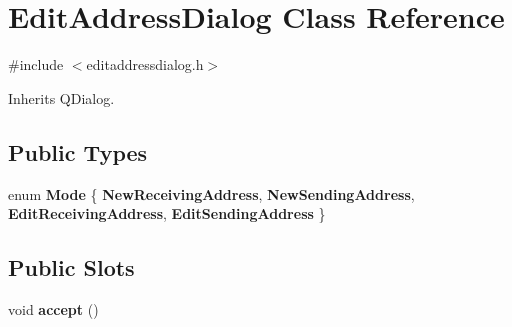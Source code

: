 \hypertarget{class_edit_address_dialog}{}\section{Edit\+Address\+Dialog Class Reference}
\label{class_edit_address_dialog}


{\ttfamily \#include $<$editaddressdialog.\+h$>$}



Inherits Q\+Dialog.

\subsection*{Public Types}
\begin{DoxyCompactItemize}
\item 
\mbox{\label{class_edit_address_dialog_a456fdd27ee1c150824241ded7bb4de3a}} 
enum {\bfseries Mode} \{ {\bfseries New\+Receiving\+Address}, 
{\bfseries New\+Sending\+Address}, 
{\bfseries Edit\+Receiving\+Address}, 
{\bfseries Edit\+Sending\+Address}
 \}
\end{DoxyCompactItemize}
\subsection*{Public Slots}
\begin{DoxyCompactItemize}
\item 
\mbox{\label{class_edit_address_dialog_ac52b71129806bccf6533d0e9441393b6}} 
void {\bfseries accept} ()
\end{DoxyCompactItemize}
